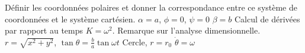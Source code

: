 \begin{solution}

\begin{questions}
    \questioncours Définir les coordonnées polaires et donner la correspondance entre ce système de coordonnées et le système cartésien.
    \question $\alpha = a$, $\phi = 0$, $\psi = 0$
    \question $\beta = b$
    \question Calcul de dérivées par rapport au temps
    \question $K = \omega^2$. Remarque sur l'analyse dimensionnelle.
    \question $r = \sqrt{x^2 + y^2}$, $\tan\theta = \frac{b}a \tan\omega t$
    \question Cercle, $r=r_0$ $\dot\theta = \omega$
\end{questions}

\end{solution}
